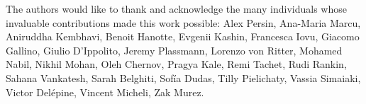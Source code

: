 
\begin{ack}
\begin{small}
The authors would like to thank and acknowledge the many individuals whose invaluable contributions made this work possible: Alex Persin, Ana-Maria Marcu, Aniruddha Kembhavi, Benoit Hanotte, Evgenii Kashin, Francesca Iovu, Giacomo Gallino, Giulio D'Ippolito, Jeremy Plassmann, Lorenzo von Ritter, Mohamed Nabil, Nikhil Mohan, Oleh Chernov, Pragya Kale, Remi Tachet, Rudi Rankin, Sahana Vankatesh, Sarah Belghiti, Sofía Dudas, Tilly Pielichaty, Vassia Simaiaki, Victor Delépine, Vincent Micheli, Zak Murez.
\end{small}
\end{ack}


